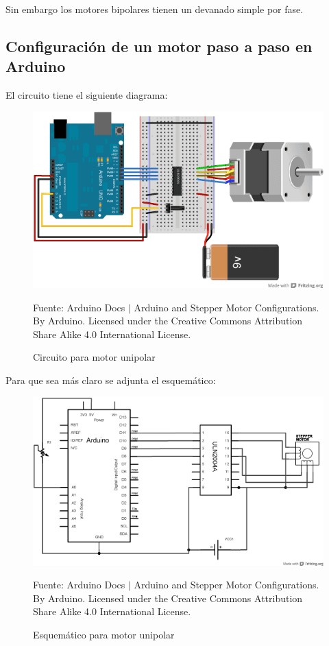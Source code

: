 \documentclass[conference]{IEEEtran}
\begin{document}
Sin embargo los motores bipolares tienen un devanado simple por fase.

\subsection{Configuración de un motor paso a paso en Arduino}

El circuito tiene el siguiente diagrama:

\begin{figure}[H]
\centering
\includegraphics[width=0.3\paperwidth]{images/unipolar-knob-circuit.png}
\caption{Circuito para motor unipolar}
\footnotesize
Fuente: Arduino Docs $\mid$ Arduino and Stepper Motor Configurations. By Arduino. Licensed under the Creative Commons Attribution Share Alike 4.0
International License.
\end{figure}

Para que sea más claro se adjunta el esquemático:

\begin{figure}[H]
\centering
\includegraphics[width=0.3\paperwidth]{images/unipolar-knob-schematic.png}
\caption{Esquemático para motor unipolar}
\footnotesize
Fuente: Arduino Docs $\mid$ Arduino and Stepper Motor Configurations. By Arduino. Licensed under the Creative Commons Attribution Share Alike 4.0
International License.
\end{figure}
\end{document}
